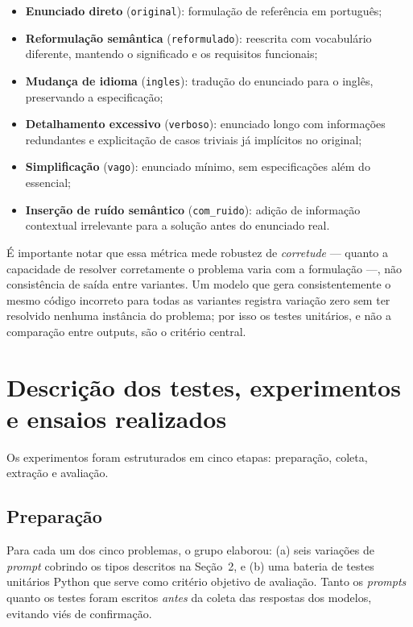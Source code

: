 \documentclass[12pt,
    english,
    french,
    spanish,
    brazil,
    ]{article}
\begin{document}
\begin{itemize}
    \item \textbf{Enunciado direto} (\texttt{original}): formulação de
    referência em português;
    \item \textbf{Reformulação semântica} (\texttt{reformulado}): reescrita
    com vocabulário diferente, mantendo o significado e os requisitos
    funcionais;
    \item \textbf{Mudança de idioma} (\texttt{ingles}): tradução do enunciado
    para o inglês, preservando a especificação;
    \item \textbf{Detalhamento excessivo} (\texttt{verboso}): enunciado longo
    com informações redundantes e explicitação de casos triviais já implícitos
    no original;
    \item \textbf{Simplificação} (\texttt{vago}): enunciado mínimo, sem
    especificações além do essencial;
    \item \textbf{Inserção de ruído semântico} (\texttt{com\_ruido}): adição
    de informação contextual irrelevante para a solução antes do enunciado
    real.
\end{itemize}

É importante notar que essa métrica mede robustez de \textit{corretude} ---
quanto a capacidade de resolver corretamente o problema varia com a formulação
---, não consistência de saída entre variantes. Um modelo que gera
consistentemente o mesmo código incorreto para todas as variantes registra
variação zero sem ter resolvido nenhuma instância do problema; por isso os
testes unitários, e não a comparação entre outputs, são o critério central.

\section{Descrição dos testes, experimentos e ensaios realizados}

Os experimentos foram estruturados em cinco etapas: preparação,
coleta, extração e avaliação.

\subsection{Preparação}

Para cada um dos cinco problemas, o grupo elaborou: (a) seis variações
de \textit{prompt} cobrindo os tipos descritos na Seção~2, e (b) uma
bateria de testes unitários Python que serve como critério objetivo de
avaliação. Tanto os \textit{prompts} quanto os testes foram escritos
\textit{antes} da coleta das respostas dos modelos, evitando viés de
confirmação.
\end{document}

